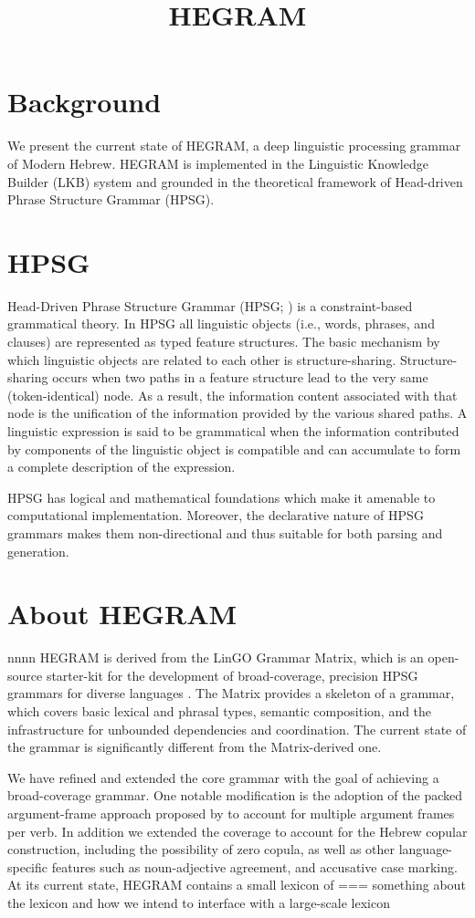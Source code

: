 \documentclass[a4paper]{article}
\title{HEGRAM}
\begin{document}
\section{Background}
We present the current state of HEGRAM, a deep linguistic processing grammar of Modern Hebrew. HEGRAM is implemented in the
Linguistic Knowledge Builder (LKB) system and grounded in the theoretical framework of
Head-driven Phrase Structure Grammar (HPSG).

\section{HPSG}
Head-Driven Phrase Structure Grammar (HPSG; \citealt{PollardSag94}) is  a constraint-based
grammatical theory. In HPSG all linguistic objects (i.e., words, phrases, and clauses) are represented as typed feature structures.
The basic mechanism by which linguistic objects are related to each
other is structure-sharing. Structure-sharing occurs when two paths in a
feature structure lead to the very same (token-identical) node. As a result,
the information content associated with that node is the unification of the
information provided by the various shared paths. A linguistic expression
is said to be grammatical when the information contributed by components
of the linguistic object is compatible and can accumulate to form
a complete description of the expression.

HPSG has logical and mathematical foundations which make it
amenable to computational implementation. Moreover, the declarative nature of HPSG grammars makes them non-directional and thus suitable for both parsing and generation.

\section{About HEGRAM}
nnnn
HEGRAM is derived from the LinGO Grammar Matrix, which is an open-source starter-kit for the development of broad-coverage, precision HPSG grammars for diverse languages \citep{BenderFlickingerOepen02}. The Matrix provides a skeleton of a grammar, which covers basic lexical and phrasal types, semantic composition, and the infrastructure for unbounded dependencies and coordination. The current state of the grammar is significantly different from the Matrix-derived one.

We have refined and extended the core grammar with the goal of achieving a broad-coverage grammar. One notable modification is the adoption of the packed argument-frame approach proposed by \citet{Haugereid11} to account for multiple argument frames per verb. In addition we extended the coverage to account for the Hebrew copular construction, including the possibility of zero copula, as well as other language-specific features such as noun-adjective agreement, and accusative case marking. At its current state, HEGRAM contains a small lexicon of
=== something about the lexicon and how we intend to interface with a large-scale lexicon
\end{document}
